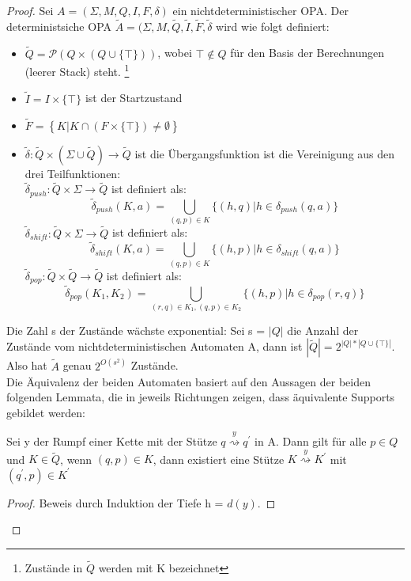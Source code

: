 \begin{proof}
Sei $A=(\Sigma, M, Q, I, F, \delta)$ ein nichtdeterministischer OPA. Der deterministsiche OPA $\tilde{A}=(\Sigma, M, \tilde{Q}, \tilde{I}, \tilde{F}, \tilde{\delta}$ wird wie folgt definiert:
\begin{itemize}
\item
$\tilde{Q} = \mathcal{P}(Q \times (Q \cup \{\top\}))$, wobei $\top \notin Q$ für den Basis der Berechnungen (leerer Stack) steht. \footnote{Zustände in $\tilde{Q}$ werden mit K bezeichnet}
\item
$\tilde{I}=I\times \{\top \}$ ist der Startzustand
\item
$\tilde{F}=\left\{K|K \cap (F \times \{\top\}) \neq \emptyset\right\}$
\item
$\tilde{\delta}: \tilde{Q} \times (\Sigma \cup \tilde{Q})\rightarrow \tilde{Q}$ ist die Übergangsfunktion ist die Vereinigung aus den drei Teilfunktionen:\\[2ex]
$\tilde{\delta}_{push}: \tilde{Q} \times \Sigma \rightarrow \tilde{Q}$ ist definiert als: 
\begin{equation*}
\tilde{\delta}_{push}(K, a) = \bigcup\limits_{(q,p) \in K} \{(h,q)|h \in \delta_{push}(q,a)\}
\end{equation*}
$\tilde{\delta}_{shift}: \tilde{Q} \times \Sigma \rightarrow \tilde{Q}$ ist definiert als: 
\begin{equation*}
\tilde{\delta}_{shift}(K, a) = \bigcup\limits_{(q,p) \in K} \{(h,p)|h \in \delta_{shift}(q,a)\}
\end{equation*}
$\tilde{\delta}_{pop}: \tilde{Q} \times \tilde{Q}\rightarrow \tilde{Q}$ ist definiert als: 
\begin{equation*}
\tilde{\delta}_{pop}(K_1, K_2) = \bigcup\limits_{(r,q) \in K_1, (q,p)\in K_2} \{(h,p)|h \in \delta_{pop}(r,q)\}
\end{equation*}
\end{itemize}
Die Zahl s der Zustände wächste exponential: Sei s = $|Q|$ die Anzahl der Zustände vom nichtdeterministischen Automaten A, dann ist $|\tilde{Q}| = 2^{|Q| * |Q \cup \{\top\}|}$. Also hat $\tilde{A}$ genau $2^{O(s^2)}$ Zustände.\\
Die Äquivalenz der beiden Automaten basiert auf den Aussagen der beiden folgenden Lemmata, die in jeweils Richtungen zeigen, dass äquivalente Supports gebildet werden:
\begin{lemma}
Sei y der Rumpf einer Kette mit der Stütze $q\stackrel{y}{\rightsquigarrow} q^\prime$ in A. Dann gilt für alle $p \in Q$ und $K \in \tilde{Q}$, wenn $(q,p) \in K$, dann existiert eine Stütze $K\stackrel{y}{\rightsquigarrow} K^\prime$ mit $(q^\prime, p) \in K^\prime $
\end{lemma}
\begin{proof}
\label{lemma_deter1}
Beweis durch Induktion der Tiefe h = $d(y)$. 

\end{proof}
\end{proof}
